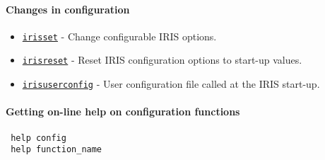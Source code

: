  \paragraph{Changes in configuration}
 
 \begin{itemize}
 \item
   \href{config/irisset}{\texttt{irisset}} - Change configurable IRIS
   options.
 \item
   \href{config/irisreset}{\texttt{irisreset}} - Reset IRIS configuration
   options to start-up values.
 \item
   \href{config/irisuserconfighelp}{\texttt{irisuserconfig}} - User
   configuration file called at the IRIS start-up.
 \end{itemize}
 
 \paragraph{Getting on-line help on configuration functions}
 
 \begin{verbatim}
 help config
 help function_name
 \end{verbatim}



